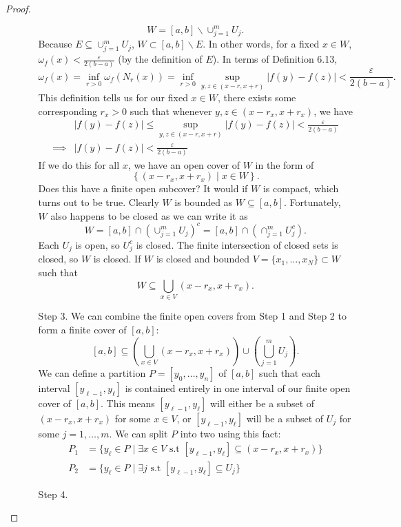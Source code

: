 \documentclass{article}
\newcommand{\abs}[1]{\left\lvert#1\right\rvert}
\newcommand{\brc}[1]{ \left\{#1\right\} }
\newcommand{\paren}[1]{ \left(#1\right) }
\theoremstyle{definition}
\begin{document}
\begin{proof}
\begin{enumerate}
\begin{enumerate}
				$$ W=[a,b]\backslash\cup_{j=1}^m U_j. $$ Because $ E \subseteq \cup_{j=1}^m U_j $, $ W \subset [a,b]\backslash E $. In other words, for a fixed $ x\in W $, $ \omega_f(x)<\frac{\varepsilon}{2(b-a)} $ (by the definition of $ E $). In terms of Definition 6.13, 
				$$ \omega_f(x)= \inf_{r > 0}\omega_f(N_r(x))= \inf_{r > 0}\sup_{y,z\in (x-r,x+r)}\abs{f(y)-f(z)}<\frac{\varepsilon}{2(b-a)}.$$
				This definition tells us for our fixed $ x\in W $, there exists some corresponding $ r_x > 0 $ such that whenever $ y,z\in (x-r_x,x+r_x) $, we have 
				\begin{align*}
					&  \abs{f(y)-f(z)}\le \sup_{y,z\in (x-r,x+r)}\abs{f(y)-f(z)} < \frac{\varepsilon}{2(b-a)}\\
					\implies &  \abs{f(y)-f(z)}< \frac{\varepsilon}{2(b-a)}
				\end{align*}
				If we do this for all $ x $, we have an open cover of $ W $ in the form of $$\brc{(x-r_x,x+r_x)\mid x \in W}.$$ Does this have a finite open subcover? It would if $ W $ is compact, which turns out to be true. Clearly $ W $ is bounded as $ W \subseteq [a,b] $. Fortunately, $ W $ also happens to be closed as we can write it as 
				$$ W = [a,b] \cap \paren{\cup_{j=1}^m U_j}^c = [a,b] \cap \paren{\cap_{j=1}^m U_j^c}.$$ Each $ U_j $ is open, so $ U_j^c $ is closed. The finite intersection of closed sets is closed, so $ W $ is closed. If $ W $ is closed and bounded $V= \{x_1,\ldots, x_N\}\subset W $ such that 
				$$ W\subseteq \bigcup_{x\in V}(x - r_{x}, x+ r_{x}).$$
				\item [Step 3.] We can combine the finite open covers from Step 1 and Step 2 to form a finite cover of $ [a,b] $:
				$$ [a,b]\subseteq \left(\bigcup_{x\in V}(x - r_{x}, x+ r_{x})\right)\cup \left(\bigcup_{j=1}^m U_j\right).$$ We can define a partition $ P=[y_0,\ldots,y_n] $ of $ [a,b] $ such that each interval $ [y_{\ell-1},y_\ell] $ is contained entirely in one interval of our finite open cover of $ [a,b] $. This means  $  [y_{\ell-1},y_\ell] $ will either be a subset of $ (x-r_x,x+r_x) $ for some $ x\in V $, or $  [y_{\ell-1},y_\ell] $ will be a subset of $ U_j $ for some $ j=1,\ldots,m $. We can split $ P $ into two using this fact:
				\begin{align*}
					P_1 &= \{y_\ell \in P \mid \exists x\in V\text{ s.t }[y_{\ell-1},y_\ell]\subseteq (x-r_x,x+r_x)\}\\
					P_2 &= \{y_\ell \in P \mid \exists j\text{ s.t }[y_{\ell-1},y_\ell]\subseteq U_j\}
				\end{align*}
			\item[Step 4.] {\tiny
}
\end{enumerate}
\end{enumerate}
\end{proof}
\end{document}
